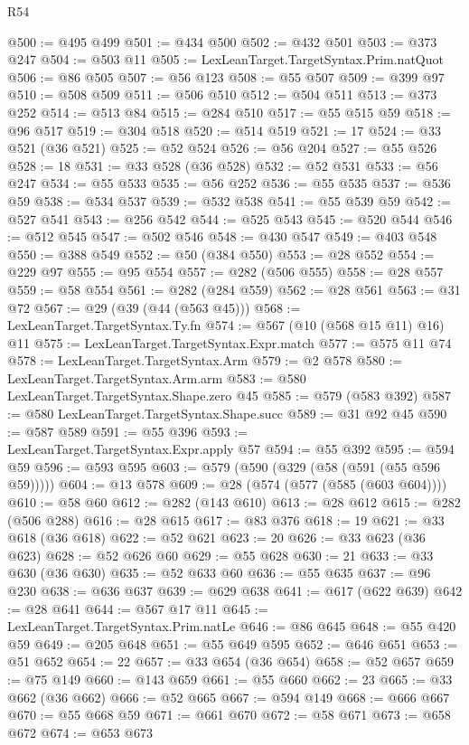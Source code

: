 \begin{lexlean}{R54}
\begin{coremodule}
@500 := @495 @499
@501 := @434 @500
@502 := @432 @501
@503 := @373 @247
@504 := @503 @11
@505 := LexLeanTarget.TargetSyntax.Prim.natQuot
@506 := @86 @505
@507 := @56 @123
@508 := @55 @507
@509 := @399 @97
@510 := @508 @509
@511 := @506 @510
@512 := @504 @511
@513 := @373 @252
@514 := @513 @84
@515 := @284 @510
@517 := @55 @515 @59
@518 := @96 @517
@519 := @304 @518
@520 := @514 @519
@521 := 17
@524 := @33 @521 (@36 @521)
@525 := @52 @524
@526 := @56 @204
@527 := @55 @526
@528 := 18
@531 := @33 @528 (@36 @528)
@532 := @52 @531
@533 := @56 @247
@534 := @55 @533
@535 := @56 @252
@536 := @55 @535
@537 := @536 @59
@538 := @534 @537
@539 := @532 @538
@541 := @55 @539 @59
@542 := @527 @541
@543 := @256 @542
@544 := @525 @543
@545 := @520 @544
@546 := @512 @545
@547 := @502 @546
@548 := @430 @547
@549 := @403 @548
@550 := @388 @549
@552 := @50 (@384 @550)
@553 := @28 @552
@554 := @229 @97
@555 := @95 @554
@557 := @282 (@506 @555)
@558 := @28 @557
@559 := @58 @554
@561 := @282 (@284 @559)
@562 := @28 @561
@563 := @31 @72
@567 := @29 (@39 (@44 (@563 @45)))
@568 := LexLeanTarget.TargetSyntax.Ty.fn
@574 := @567 (@10 (@568 @15 @11) @16) @11
@575 := LexLeanTarget.TargetSyntax.Expr.match
@577 := @575 @11 @74
@578 := LexLeanTarget.TargetSyntax.Arm
@579 := @2 @578
@580 := LexLeanTarget.TargetSyntax.Arm.arm
@583 := @580 LexLeanTarget.TargetSyntax.Shape.zero @45
@585 := @579 (@583 @392)
@587 := @580 LexLeanTarget.TargetSyntax.Shape.succ
@589 := @31 @92 @45
@590 := @587 @589
@591 := @55 @396
@593 := LexLeanTarget.TargetSyntax.Expr.apply @57
@594 := @55 @392
@595 := @594 @59
@596 := @593 @595
@603 := @579 (@590 (@329 (@58 (@591 (@55 @596 @59)))))
@604 := @13 @578
@609 := @28 (@574 (@577 (@585 (@603 @604))))
@610 := @58 @60
@612 := @282 (@143 @610)
@613 := @28 @612
@615 := @282 (@506 @288)
@616 := @28 @615
@617 := @83 @376
@618 := 19
@621 := @33 @618 (@36 @618)
@622 := @52 @621
@623 := 20
@626 := @33 @623 (@36 @623)
@628 := @52 @626 @60
@629 := @55 @628
@630 := 21
@633 := @33 @630 (@36 @630)
@635 := @52 @633 @60
@636 := @55 @635
@637 := @96 @230
@638 := @636 @637
@639 := @629 @638
@641 := @617 (@622 @639)
@642 := @28 @641
@644 := @567 @17 @11
@645 := LexLeanTarget.TargetSyntax.Prim.natLe
@646 := @86 @645
@648 := @55 @420 @59
@649 := @205 @648
@651 := @55 @649 @595
@652 := @646 @651
@653 := @51 @652
@654 := 22
@657 := @33 @654 (@36 @654)
@658 := @52 @657
@659 := @75 @149
@660 := @143 @659
@661 := @55 @660
@662 := 23
@665 := @33 @662 (@36 @662)
@666 := @52 @665
@667 := @594 @149
@668 := @666 @667
@670 := @55 @668 @59
@671 := @661 @670
@672 := @58 @671
@673 := @658 @672
@674 := @653 @673

\end{coremodule}
\end{lexlean}
